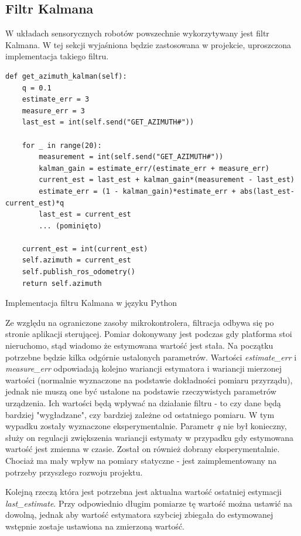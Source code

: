 \subsection{Filtr Kalmana}
W układach sensorycznych robotów powszechnie wykorzytywany jest filtr Kalmana\cite{Kedzierski2016}. W tej sekcji wyjaśniona będzie zastosowana w projekcie, uproszczona implementacja takiego filtru.

\begin{listing}[ht]
\begin{verbatim}
def get_azimuth_kalman(self):
    q = 0.1
    estimate_err = 3
    measure_err = 3
    last_est = int(self.send("GET_AZIMUTH#"))

    for _ in range(20):
        measurement = int(self.send("GET_AZIMUTH#"))
        kalman_gain = estimate_err/(estimate_err + measure_err)
        current_est = last_est + kalman_gain*(measurement - last_est)
        estimate_err = (1 - kalman_gain)*estimate_err + abs(last_est-current_est)*q
        last_est = current_est
        ... (pominięto)
        
    current_est = int(current_est)
    self.azimuth = current_est
    self.publish_ros_odometry()
    return self.azimuth
\end{verbatim}
\caption{Implementacja filtru Kalmana w języku Python}
\label{lst:kalman}
\end{listing}

Ze względu na ograniczone zasoby mikrokontrolera, filtracja odbywa się po stronie aplikacji sterującej. Pomiar dokonywany jest podczas gdy platforma stoi nieruchomo, stąd wiadomo że estymowana wartość jest stała. Na początku potrzebne będzie kilka odgórnie ustalonych parametrów. Wartości \emph{estimate\_err} i \emph{measure\_err} odpowiadają kolejno wariancji estymatora i wariancji mierzonej wartości (normalnie wyznaczone na podstawie dokładności pomiaru przyrządu), jednak nie muszą one być ustalone na podstawie rzeczywistych parametrów urządzenia. Ich wartości będą wpływać na działanie filtru - to czy dane będą bardziej "wygładzane", czy bardziej zależne od ostatniego pomiaru. W tym wypadku zostały wyznaczone eksperymentalnie. Parametr \emph{q} nie był konieczny, służy on regulacji zwiększenia wariancji estymaty w przypadku gdy estymowana wartość jest zmienna w czasie. Został on również dobrany eksperymentalnie. Chociaż ma mały wpływ na pomiary statyczne - jest zaimplementowany na potrzeby przyszłego rozwoju projektu.

Kolejną rzeczą która jest potrzebna jest aktualna wartość ostatniej estymacji \emph{last\_estimate}. Przy odpowiednio długim pomiarze tę wartość można ustawić na dowolną, jednak aby wartość estymatora szybciej zbiegała do estymowanej wstępnie zostaje ustawiona na zmierzoną wartość.

